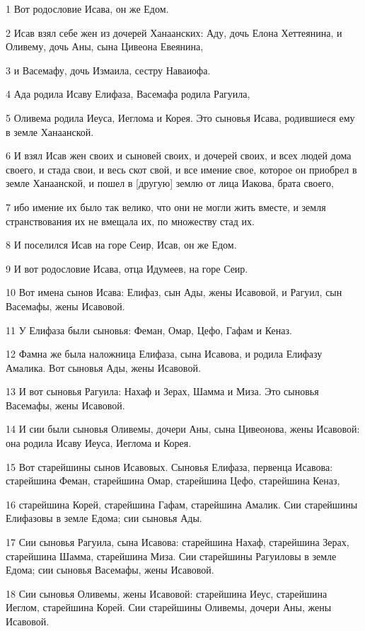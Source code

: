 \par 1 Вот родословие Исава, он же Едом.
\par 2 Исав взял себе жен из дочерей Ханаанских: Аду, дочь Елона Хеттеянина, и Оливему, дочь Аны, сына Цивеона Евеянина,
\par 3 и Васемафу, дочь Измаила, сестру Наваиофа.
\par 4 Ада родила Исаву Елифаза, Васемафа родила Рагуила,
\par 5 Оливема родила Иеуса, Иеглома и Корея. Это сыновья Исава, родившиеся ему в земле Ханаанской.
\par 6 И взял Исав жен своих и сыновей своих, и дочерей своих, и всех людей дома своего, и стада свои, и весь скот свой, и все имение свое, которое он приобрел в земле Ханаанской, и пошел в [другую] землю от лица Иакова, брата своего,
\par 7 ибо имение их было так велико, что они не могли жить вместе, и земля странствования их не вмещала их, по множеству стад их.
\par 8 И поселился Исав на горе Сеир, Исав, он же Едом.
\par 9 И вот родословие Исава, отца Идумеев, на горе Сеир.
\par 10 Вот имена сынов Исава: Елифаз, сын Ады, жены Исавовой, и Рагуил, сын Васемафы, жены Исавовой.
\par 11 У Елифаза были сыновья: Феман, Омар, Цефо, Гафам и Кеназ.
\par 12 Фамна же была наложница Елифаза, сына Исавова, и родила Елифазу Амалика. Вот сыновья Ады, жены Исавовой.
\par 13 И вот сыновья Рагуила: Нахаф и Зерах, Шамма и Миза. Это сыновья Васемафы, жены Исавовой.
\par 14 И сии были сыновья Оливемы, дочери Аны, сына Цивеонова, жены Исавовой: она родила Исаву Иеуса, Иеглома и Корея.
\par 15 Вот старейшины сынов Исавовых. Сыновья Елифаза, первенца Исавова: старейшина Феман, старейшина Омар, старейшина Цефо, старейшина Кеназ,
\par 16 старейшина Корей, старейшина Гафам, старейшина Амалик. Сии старейшины Елифазовы в земле Едома; сии сыновья Ады.
\par 17 Сии сыновья Рагуила, сына Исавова: старейшина Нахаф, старейшина Зерах, старейшина Шамма, старейшина Миза. Сии старейшины Рагуиловы в земле Едома; сии сыновья Васемафы, жены Исавовой.
\par 18 Сии сыновья Оливемы, жены Исавовой: старейшина Иеус, старейшина Иеглом, старейшина Корей. Сии старейшины Оливемы, дочери Аны, жены Исавовой.
